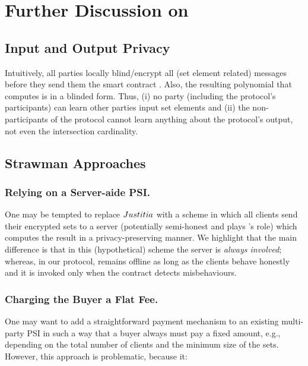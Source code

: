 

\section{Further Discussion on  \withFai}\label{sec::Discussion-justitia}


\subsection{Input and Output Privacy}

Intuitively, all parties locally blind/encrypt all (set element related) messages before they send them the smart contract \scf. Also, the resulting polynomial that \scf computes is in a blinded form. Thus, (i) no party (including the protocol's participants) can learn other parties input set elements and (ii) the non-participants of the protocol cannot learn anything about the protocol's output, not even the intersection cardinality. 


\subsection{Strawman Approaches}


\subsubsection{Relying on a Server-aide PSI.} One may be tempted to replace ${Justitia}$ with a scheme in which all clients send their encrypted sets to a server (potentially semi-honest and plays \aud's role) which computes the result in a privacy-preserving manner.  We highlight that the main difference is that in this (hypothetical) scheme the server is \emph{always involved};  whereas, in our protocol, \aud remains offline as long as the clients behave honestly and it is invoked only when the contract detects misbehaviours.  


\subsubsection{Charging the Buyer a Flat Fee.}
One may want to add a straightforward payment mechanism to an existing multi-party PSI in such a way that a buyer always must pay a fixed amount, e.g., depending on the total number of clients and the minimum size of the sets. However, this approach is problematic, because it:

